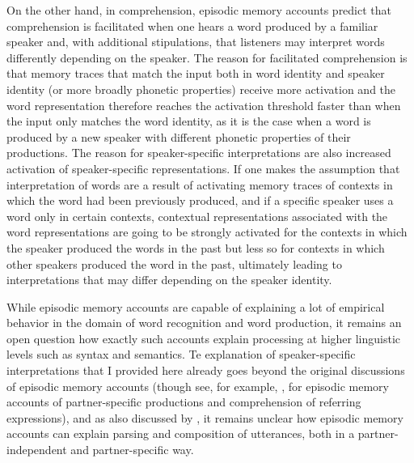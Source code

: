 On the other hand, in comprehension, episodic memory accounts predict that comprehension is facilitated when one hears a word produced by a familiar speaker and, with additional stipulations,
that listeners may interpret words differently depending on the speaker. The reason for facilitated comprehension is that memory traces that match the input both in word identity and
speaker identity (or more broadly phonetic properties) receive more activation and the word representation therefore reaches the activation threshold faster than when the input
only matches the word identity, as it is the case when a word is produced by a new speaker with different phonetic properties of their productions.
The reason for speaker-specific interpretations are also increased activation of speaker-specific representations. If one makes the assumption that interpretation of words are a result
of activating memory traces of contexts in which the word had been previously produced, and if a specific speaker uses a word only in certain contexts,  contextual representations
associated with the word representations are going to be strongly activated for the contexts in which the speaker produced the words in the past but  less so for contexts in which other speakers
produced the word in the past, ultimately leading to interpretations that may differ depending on the speaker identity.


While episodic memory accounts are capable of explaining a lot of empirical behavior in the domain of word recognition and word production,
it remains an open question how exactly such accounts explain processing at higher linguistic levels such as syntax and semantics. 
Te explanation of speaker-specific interpretations that I provided here already goes beyond the original discussions of episodic memory accounts
(though see, for example, \cite{HortonGerrig2005,HortonGerrig2016}, for episodic memory accounts of partner-specific productions and
comprehension of referring expressions), and as also discussed by \cite{Goldinger1998}, it remains unclear how episodic memory accounts
can explain parsing and composition of utterances, both in a partner-independent and partner-specific way.

